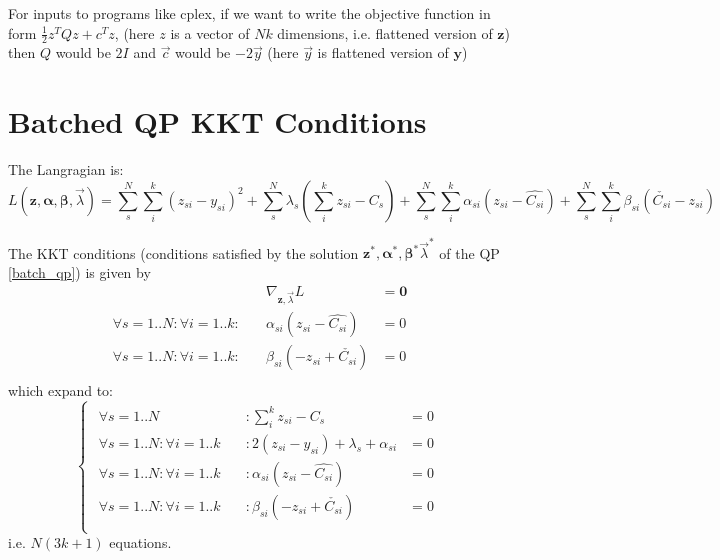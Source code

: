 \documentclass[11 pt]{article}
\begin{document}
For inputs to programs like cplex, if we want to write the objective function in form $\frac{1}{2}z^T Q z + c^Tz$, (here $z$ is a vector of $Nk$ dimensions, i.e. flattened version of $\bm{z}$) then $Q$ would be $2I$ and $\vec{c}$ would be $-2\vec{y}$ (here $\vec{y}$ is flattened version of $\bm{y}$)


\section{Batched QP KKT Conditions}

The Langragian is:
\begin{equation}
    L(\bm{z},\bm{\alpha},\bm{\beta},\vec{\lambda}) = \sum_s^N \sum_i^k (z_{si}-y_{si})^2 + \sum_s^N \lambda_s (\sum_i^k z_{si} - C_s) + \sum_s^N \sum_i^k \alpha_{si}(z_{si} - \hat{C_{si}}) + \sum_s^N \sum_i^k \beta_{si}(\check{C_{si}} - z_{si})
\end{equation}

The KKT conditions (conditions satisfied by the solution $\bm{z}^*, \bm{\alpha}^*, \bm{\beta}^* \vec{\lambda}^*$ of the QP \ref{batch_qp}) is given by
\begin{align*}
    &\nabla_{\bm{z},\vec{\lambda}} L & = \bm{0} \\
    \forall s=1..N: \forall i=1..k: \quad &\alpha_{si}(z_{si} - \hat{C_{si}}) & = 0 \\
    \forall s=1..N: \forall i=1..k: \quad &\beta_{si}(-z_{si} + \check{C_{si}}) & = 0 \\
\end{align*}
which expand to:
\begin{equation}\label{eqns_batch_kkt}
    \begin{cases}
        \begin{aligned}
            \forall s=1..N &: \sum_i^k z_{si} - C_s & = 0 \\
            \forall s=1..N : \forall i=1..k \quad &: 2(z_{si}-y_{si}) + \lambda_s + \alpha_{si} & = 0 \\
            \forall s=1..N : \forall i=1..k \quad &: \alpha_{si}(z_{si} - \hat{C_{si}}) & = 0 \\
            \forall s=1..N : \forall i=1..k \quad &: \beta_{si}(-z_{si} + \check{C_{si}}) & = 0 \\
        \end{aligned}
    \end{cases}
\end{equation}
i.e. $N(3k+1)$ equations.
\end{document}
